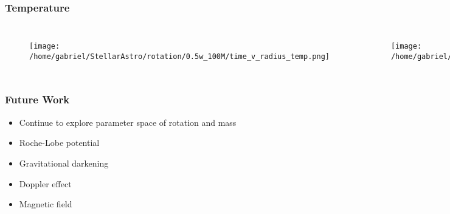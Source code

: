 \documentclass{beamer}
\begin{document}
\begin{frame}
\frametitle{Temperature}
        \begin{columns}[c]
\begin{figure}
    \begin{center}
      \texttt{[image: /home/gabriel/StellarAstro/rotation/0.5w\_100M/time\_v\_radius\_temp.png]}
    \end{center}
  \end{figure}

        \begin{figure}
    \begin{center}
      \texttt{[image: /home/gabriel/StellarAstro/rotation/0.9w\_100M/time\_v\_radius\_temp.png]}
    \end{center}
  \end{figure}

        \end{columns}
\end{frame}



\begin{frame}
\frametitle{Future Work}
  \begin{itemize}
    \item Continue to explore parameter space of rotation and mass
    \item Roche-Lobe potential
    \item Gravitational darkening
    \item Doppler effect
    \item Magnetic field
  \end{itemize}
\end{frame}
\end{document}
